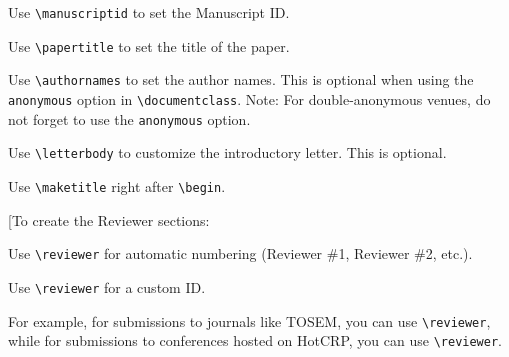 \documentclass[minor, conference, anonymous]{responseletter}
\begin{document}
\maketitle

{\color{red}

Use \texttt{\textbackslash{manuscriptid}} to set the Manuscript ID.

Use \texttt{\textbackslash{papertitle}} to set the title of the paper.

Use \texttt{\textbackslash{authornames}} to set the author names. This is optional when using the \texttt{anonymous} option in \texttt{\textbackslash{documentclass}}. Note: For double-anonymous venues, do not forget to use the \texttt{anonymous} option.

Use \texttt{\textbackslash{letterbody}} to customize the introductory letter. This is optional.

Use \texttt{\textbackslash{maketitle}} right after \texttt{\textbackslash{begin}}.

}


\metareview


\reviewer

\response[To create the Reviewer sections:

Use \texttt{\textbackslash{reviewer}} for automatic numbering (Reviewer \#1, Reviewer \#2, etc.).

Use \texttt{\textbackslash{reviewer}\string[<ID>\string]} for a custom ID.

For example, for submissions to journals like TOSEM, you can use \texttt{\textbackslash{reviewer}}, while for submissions to conferences hosted on HotCRP, you can use \texttt{\textbackslash{reviewer}}.
\end{document}
